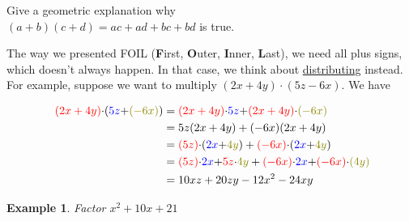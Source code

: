 \documentclass[twoside]{tufte-handout}
\newcounter{ekcounter}%
\theoremstyle{ekimcustom}
\newtheorem{exm}[ekcounter]{Example}
\begin{document}
%


Give a geometric explanation why\\ $(a+b)(c+d)=ac+ad+bc+bd$ is true.


The way we presented FOIL (\textbf{F}irst, \textbf{O}uter, \textbf{I}nner, \textbf{L}ast), we need all plus signs, which doesn't always happen. In that case, we think about {\underline{distributing}} instead. For example, suppose we want to multiply $(2x+4y)\cdot(5z-6x)$. We have

	\begin{align*}
\text{	\textcolor{red}{$(2x+4y)$}$\cdot ($\textcolor{blue}{$5z$}$+$\textcolor{olive}{$(-6x)$})}&=
	\text{\textcolor{red}{$(2x+4y)$}$\cdot $\textcolor{blue}{$5z$}$+$\textcolor{red}{$(2x+4y)$}$\cdot$\textcolor{olive}{$(-6x)$}}\\
	&=5z(2x+4y)+(-6x)(2x+4y)\\
		&=  \text{\textcolor{red}{$(5z)$}$\cdot ($\textcolor{blue}{$2x$}$+$\textcolor{olive}{$4y$}})+\text{\textcolor{red}{$(-6x)$}$\cdot ($\textcolor{blue}{$2x$}$+$\textcolor{olive}{$4y$}})\\        
	&=  \text{\textcolor{red}{$(5z)$}$\cdot $\textcolor{blue}{$2x$}$+$\textcolor{red}{$5z$}$\cdot$\textcolor{olive}{$4y$}}+\text{\textcolor{red}{$(-6x)$}$\cdot $\textcolor{blue}{$2x$}$+$\textcolor{red}{$(-6x)$}$\cdot$\textcolor{olive}{$(4y)$}}\\&=10xz+20zy-12x^2-24xy\\
	\end{align*}





\everymath{\displaystyle}
\begin{exm}{}Factor $x^2 + 10x+ 21$
\end{exm}\vskip10pt
\end{document}

